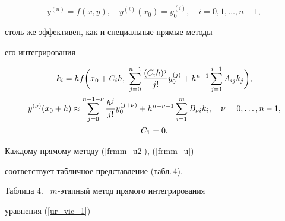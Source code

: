 \begin{equation}


y^{(n)} = f(x,y),\quad y^{(i)}(x_0)=y_{0}^{(i)},


\quad i=0,1,\dotsc,n-1,\label{ur_vic_1}


\end{equation}


столь же эффективен, как и специальные прямые методы 


его интегрирования


\begin{gather}


k_{i} = hf\bigg(x_{0}+C_{i} h,\


\sum_{j=0}^{n-1}\frac{(C_{i} h)^{j}}


{j! }y_0^{(j)}


+h^{n-1}\sum_{j=1}^{i-1}A_{ij} k_{j}\bigg) ,\notag\\


%


y^{(\nu)}(x_0+h)\approx \sum_{j=0}^{n-1-\nu}\frac{h^{j}}{j! }


y_0^{(j+\nu)}


+h^{n-\nu-1}\sum_{i=1}^{m}B_{\nu i} k_{i},\quad \nu =0,\dotsc,n-1,


\label{frmm_u2} \\


%


C_{1} =0. \label{frmm_u}


\end{gather}


Каждому прямому методу (\ref{frmm_u2}), (\ref{frmm_u})


соответствует табличное представление (табл.\,4).


\smallskip





\begin{center}


Таблица 4. \ $m$-этапный метод прямого интегрирования


уравнения (\ref{ur_vic_1})


\end{center}





